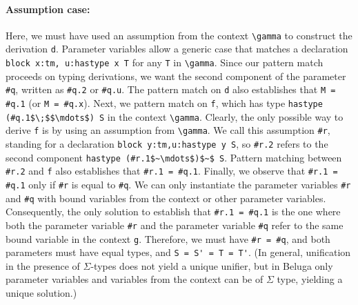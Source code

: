  \paragraph{Assumption case:} Here, we must have used an assumption from the
 context \lstinline!\gamma! to construct the derivation \lstinline{d}.  Parameter variables
  allow a generic case that matches a declaration
\lstinline!block x:tm, u:hastype x T! for any \lstinline{T} in \lstinline!\gamma!. Since our pattern match
 proceeds on typing derivations, we want the second component of the
 parameter \lstinline{#q}, written as \lstinline{#q.2} or \lstinline!#q.u!.  The pattern match on \lstinline{d}
 also establishes that \lstinline{M = #q.1} (or \lstinline!M = #q.x!).
 Next, we pattern match on \lstinline{f}, which has type
\lstinline!hastype (#q.1$\;$$\mdots$) S! in the context \lstinline!\gamma!.  Clearly, the only
 possible way to derive \lstinline{f} is by using an assumption from \lstinline!\gamma!. We call
 this assumption \lstinline{#r}, standing for a declaration
\lstinline!block y:tm,u:hastype y S!, so \lstinline{#r.2} refers to the second component
\lstinline!hastype (#r.1$~\mdots$)$~$ S!. Pattern matching between \lstinline{#r.2} and \lstinline{f}
 also establishes that %
 \lstinline{#r.1 = #q.1}.  Finally, we observe that \lstinline{#r.1 = #q.1} only if
 \lstinline{#r} is equal to \lstinline{#q}. We can only instantiate the parameter
 variables \lstinline!#r! and \lstinline!#q! with bound variables from
 the context or other parameter variables. Consequently, the only
 solution to establish that \lstinline{#r.1 = #q.1} is the one where both the
 parameter variable \lstinline!#r! and the parameter variable
 \lstinline!#q! refer to the same bound variable in
 the context \lstinline!g!.  Therefore, we must have
 \lstinline!#r = #q!, and both
 parameters must have equal types, and \lstinline{S = S' = T = T'}.  (In general,
 unification in the presence
 of $\Sigma$-types does not yield a unique unifier, but in Beluga only
 parameter variables and variables from the context can be of $\Sigma$ type,
 yielding a unique solution.)


